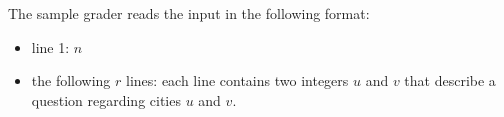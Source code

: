 The sample grader reads the input in the following format:
\begin{itemize}
\item line 1: $n$
\item the following $r$ lines: each line contains two integers $u$ and $v$ that describe a question regarding cities $u$ and $v$.
\end{itemize}